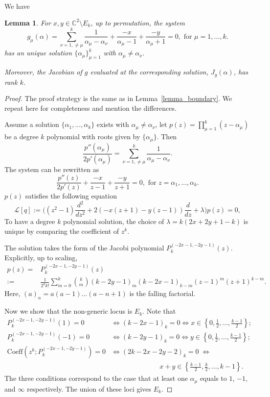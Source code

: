 \documentclass[11pt]{amsart}
\newtheorem{lemma}[theorem]{Lemma}
\theoremstyle{remark}
\numberwithin{equation}{section}
\begin{document}
We have
\begin{lemma} \label{lemma_principal} For $x,y \in \mathbb{C}^2 \setminus E_k$, up to permutation, the system 
\[
    g_{\mu}(\alpha) = \sum_{\nu=1,\neq \mu}^k\frac{1}{\alpha_{\mu } - \alpha_{\nu }} + \frac{-x}{\alpha_{\mu} - 1} + \frac{-y}{\alpha_{\mu} + 1}=0,
    \mbox{ for $\mu =1,\dots,k.$}
\]
has an unique solution $\{ \alpha_\mu \}_{\mu=1}^k$ with $\alpha_\mu \neq \alpha_\nu$.

Moreover, the Jacobian of $g$ evaluated at the corresponding solution, $J_g(\alpha)$, has rank $k$. 
\end{lemma}
\begin{proof}
The proof strategy is the same as in Lemma~\ref{lemma_boundary}. We repeat here for completeness and mention the differences.

Assume a solution $\{ \alpha_1,\dots,\alpha_k \}$ exists with $\alpha_\mu \neq \alpha_\nu$,
let $p(z) = \prod_{\mu=1}^k (z- \alpha_\mu)$ be a degree $k$ polynomial with roots given by $\{ \alpha_\mu \}$. Then
\[
    \frac{p''(\alpha_\mu)}{2p'(\alpha_\mu)} = \sum_{\nu=1,\neq \mu}^k \frac{1}{\alpha_\mu - \alpha_\nu}.
\]
The system can be rewritten as
\[
    \frac{p''(z)}{2p'(z)} + \frac{-x}{z-1} + \frac{-y}{z +1} = 0, \text{ for }z=\alpha_1,\dots,\alpha_k.
\]
$p(z)$ satisfies the following equation
\[
    \mathcal{L}[q] := \Big( (z^2-1)\frac{d^2}{dz^2} + 2(-x(z+1)-y(z-1)) \frac{d}{dz} + \lambda \Big) p(z) =0,
\]
To have a degree $k$ polynomial solution, the choice of $\lambda = k(2x+2y+1-k)$ is unique by comparing the coefficient of $z^k$.


The solution takes the form of the Jacobi polynomial $P_k^{(-2x-1, -2y-1)}(z)$. Explicitly, up to scaling,
\[
\begin{split}
    p(z)
    =& P_k^{(-2x-1, -2y-1)}(z) 
    \\
    :=& \frac{1}{2^k k!} \sum_{m=0}^k \binom{k}{m} (k-2y-1)_m (k-2x-1)_{k-m} (z-1)^m (z+1)^{k-m}.
\end{split}
\]
Here, $(a)_n = a(a-1)\dots(a-n+1)$ is the falling factorial.

Now we show that the non-generic locus is $E_k$. Note that 
\[
\begin{split}
P_k^{(-2x-1, -2y-1)}(1) = 0  &\Leftrightarrow (k-2x-1)_k = 0 \Leftrightarrow  x \in \left\{ 0, \frac{1}{2}, \dots, \frac{k-1}{2} \right\};
\\
P_k^{(-2x-1, -2y-1)}(-1) = 0  &\Leftrightarrow (k-2y-1)_k = 0  \Leftrightarrow  y \in \left\{ 0, \frac{1}{2}, \dots, \frac{k-1}{2} \right\};
\\
\text{Coeff}(z^k; P_k^{(-2x-1, -2y-1)})=0 &\Leftrightarrow (2k-2x-2y-2)_k = 0 \;  \Leftrightarrow 
\\
&\hspace{85pt}  x+y \in \left\{ \frac{k-1}{2}, \frac{k}{2}, \dots, k-1 \right\}.
\end{split}
\]
The three conditions correspond to the case that at least one $\alpha_\mu$ equals to $1$, $-1$, and $\infty$ respectively. The union of these loci gives $E_k$. 


\end{proof}
\end{document}
